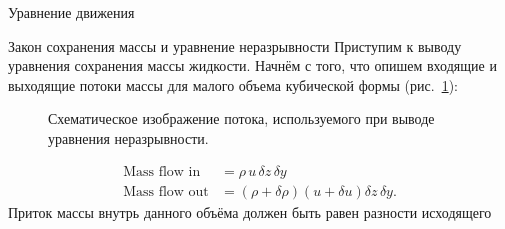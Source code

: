 \begin{chapter}{Уравнение движения}
\begin{section}{Закон сохранения массы и уравнение неразрывности}
Приступим к выводу уравнения сохранения массы жидкости. Начнём с того, 
что опишем входящие и выходящие потоки массы для малого объема кубической 
формы (рис.~\ref{fig:continuitysketchR}):
%
\begin{figure}[h!]
\caption{Схематическое изображение потока, используемого при выводе уравнения
неразрывности.}
\label{fig:continuitysketchR}
\end{figure}
%
\begin{align*}
\text{Mass flow in}  &= \rho \, u \, \delta z \, \delta y \\
\text{Mass flow out} &= (\rho + \delta \rho ) (u + \delta u) \delta z \,  \delta y.
\end{align*}
%
%
Приток массы внутрь данного объёма должен быть равен разности исходящего

\end{section}
\end{chapter}
